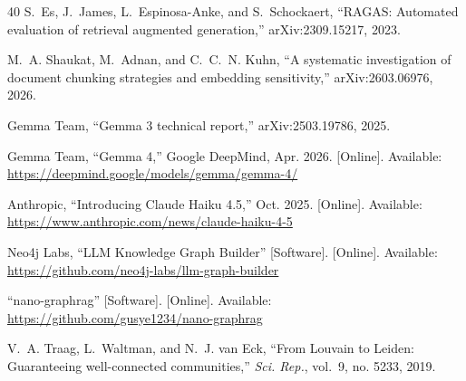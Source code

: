 \begin{thebibliography}{40}
S.~Es, J.~James, L.~Espinosa-Anke, and S.~Schockaert, ``RAGAS: Automated
evaluation of retrieval augmented generation,'' arXiv:2309.15217, 2023.

M.~A. Shaukat, M.~Adnan, and C.~C.~N. Kuhn, ``A systematic investigation
of document chunking strategies and embedding sensitivity,''
arXiv:2603.06976, 2026.

Gemma Team, ``Gemma 3 technical report,'' arXiv:2503.19786, 2025.

Gemma Team, ``Gemma 4,'' Google DeepMind, Apr. 2026. [Online]. Available:
\url{https://deepmind.google/models/gemma/gemma-4/}

Anthropic, ``Introducing Claude Haiku 4.5,'' Oct. 2025. [Online].
Available: \url{https://www.anthropic.com/news/claude-haiku-4-5}

Neo4j Labs, ``LLM Knowledge Graph Builder'' [Software]. [Online].
Available: \url{https://github.com/neo4j-labs/llm-graph-builder}

``nano-graphrag'' [Software]. [Online]. Available:
\url{https://github.com/gusye1234/nano-graphrag}

V.~A. Traag, L.~Waltman, and N.~J. van Eck, ``From Louvain to Leiden:
Guaranteeing well-connected communities,'' \emph{Sci. Rep.}, vol.~9, no.
5233, 2019.

\end{thebibliography}
